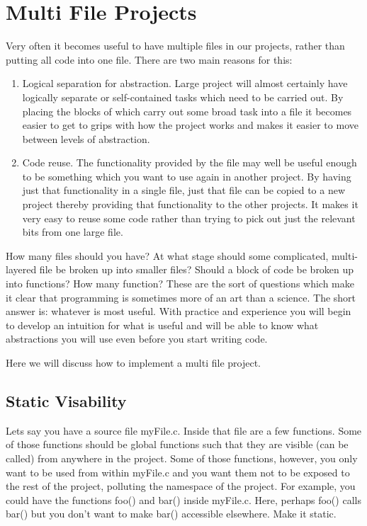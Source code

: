 \chapter{Multi File Projects}
Very often it becomes useful to have multiple files in our projects, rather than putting all code into one file.
There are two main reasons for this:
\begin{enumerate}
  \item Logical separation for abstraction. Large project will almost certainly have logically separate or self-contained tasks which need to be carried out.
    By placing the blocks of which carry out some broad task into a file it becomes easier to get to grips with how the project works and makes it easier to move between levels of abstraction.
  \item Code reuse. The functionality provided by the file may well be useful enough to be something which you want to use again in another project.
    By having just that functionality in a single file, just that file can be copied to a new project thereby providing that functionality to the other projects.
    It makes it very easy to reuse some code rather than trying to pick out just the relevant bits from one large file. 
\end{enumerate}
How many files should you have? At what stage should some complicated, multi-layered file be broken up into smaller files? Should a block of code be broken up into functions? How many function? 
These are the sort of questions which make it clear that programming is sometimes more of an art than a science. 
The short answer is: whatever is most useful. 
With practice and experience you will begin to develop an intuition for what is useful and will be able to know what abstractions you will use even before you start writing code. 

Here we will discuss how to implement a multi file project.

\section{Static Visability}
Lets say you have a source file myFile.c. Inside that file are a few functions. Some of those functions should be global functions such that they are visible (can be called) from anywhere in the project.
Some of those functions, however, you only want to be used from within myFile.c and you want them not to be exposed to the rest of the project, polluting the namespace of the project. 
For example, you could have the functions foo() and bar() inside myFile.c. Here, perhaps foo() calls bar() but you don't want to make bar() accessible elsewhere. Make it static.

